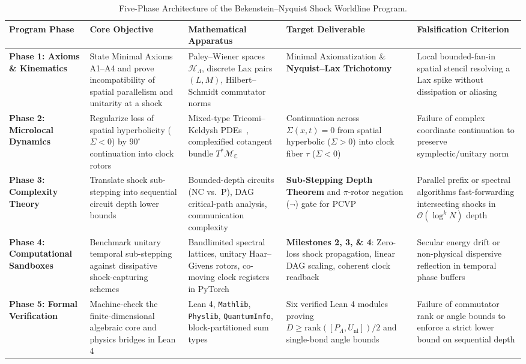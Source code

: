 \documentclass[11pt,a4paper]{article}
\theoremstyle{definition}
\begin{document}
\begin{table}[htbp]
\centering
\caption{Five-Phase Architecture of the Bekenstein--Nyquist Shock Worldline Program.}
\label{tab:program-overview}
\footnotesize
\begin{tabular}{L{2.1cm}L{2.9cm}L{2.9cm}L{2.9cm}L{2.8cm}}
\toprule
\textbf{Program Phase} & \textbf{Core Objective} & \textbf{Mathematical Apparatus} & \textbf{Target Deliverable} & \textbf{Falsification Criterion} \\
\midrule
\textbf{Phase 1: Axioms \& Kinematics} & State Minimal Axioms A1--A4 and prove incompatibility of spatial parallelism and unitarity at a shock & Paley--Wiener spaces $\mathcal{H}_{\Lambda}$, discrete Lax pairs $(L, M)$, Hilbert--Schmidt commutator norms & Minimal Axiomatization \& \textbf{Nyquist--Lax Trichotomy} & Local bounded-fan-in spatial stencil resolving a Lax spike without dissipation or aliasing \\
\addlinespace
\textbf{Phase 2: Microlocal Dynamics} & Regularize loss of spatial hyperbolicity ($\Sigma < 0$) by $90^\circ$ continuation into clock rotors & Mixed-type Tricomi--Keldysh PDEs~\cite{tricomi1923,keldysh1951}, complexified cotangent bundle $T^*\mathcal{M}_{\mathbb{C}}$ & Continuation across $\Sigma(x,t) = 0$ from spatial hyperbolic ($\Sigma > 0$) into clock fiber $\tau$ ($\Sigma < 0$) & Failure of complex coordinate continuation to preserve symplectic/unitary norm \\
\addlinespace
\textbf{Phase 3: Complexity Theory} & Translate shock sub-stepping into sequential circuit depth lower bounds & Bounded-depth circuits ($\mathrm{NC}$ vs.\ $\mathrm{P}$), DAG critical-path analysis, communication complexity & \textbf{Sub-Stepping Depth Theorem} and $\pi$-rotor negation ($\neg$) gate for PCVP~\cite{goldschlager1977,limaye2009} & Parallel prefix or spectral algorithms fast-forwarding intersecting shocks in $\mathcal{O}(\log^k N)$ depth \\
\addlinespace
\textbf{Phase 4: Computational Sandboxes} & Benchmark unitary temporal sub-stepping against dissipative shock-capturing schemes & Bandlimited spectral lattices, unitary Haar--Givens rotors, co-moving clock registers in PyTorch & \textbf{Milestones 2, 3, \& 4}: Zero-loss shock propagation, linear DAG scaling, coherent clock readback & Secular energy drift or non-physical dispersive reflection in temporal phase buffers \\
\addlinespace
\textbf{Phase 5: Formal Verification} & Machine-check the finite-dimensional algebraic core and physics bridges in Lean 4 & Lean 4, \texttt{Mathlib}, \texttt{Physlib}, \texttt{QuantumInfo}, block-partitioned sum types~\cite{mathlib2020,tooby2024} & Six verified Lean 4 modules proving $D \ge \mathrm{rank}([P_{\Lambda}, U_{\text{nl}}])/2$ and single-bond angle bounds & Failure of commutator rank or angle bounds to enforce a strict lower bound on sequential depth \\
\bottomrule
\end{tabular}
\end{table}
\end{document}
